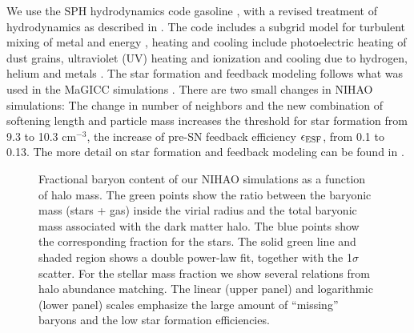 \documentclass[useAMS,usenatbib]{mn2e}
\begin{document}
We use the SPH hydrodynamics code {\sc gasoline} \citep{Wadsley04},
with a revised treatment of  hydrodynamics as described in
\citet{Keller14}.  The code includes a subgrid model for turbulent
mixing of metal and energy \citep{Wadsley08}, heating and cooling
include photoelectric heating of dust grains, ultraviolet (UV) heating
and ionization and  cooling due to hydrogen, helium and metals
\citep{Shen10}.  The star formation and feedback modeling follows what
was used in the MaGICC simulations \citep{Stinson13}.  There are two
small changes in NIHAO simulations: The change in  number of neighbors
and the new combination of softening length and  particle mass increases
the threshold for star formation from  9.3 to 10.3
cm$^{-3}$, the increase of pre-SN feedback efficiency $\epsilon_{\rm
  ESF}$, from 0.1 to 0.13.  The more detail on star formation and
feedback modeling can be found in \citet{Wang15}.





\begin{figure}
\centerline{
}
\caption{Fractional baryon content of our NIHAO simulations  as a
  function of halo mass. The green points show the ratio between the
  baryonic mass (stars + gas) inside the virial radius and the total
  baryonic mass associated with the dark matter halo. The blue points
  show the corresponding fraction for the stars. The solid green line
  and shaded region shows a double power-law fit, together with the
  1$\sigma$ scatter. For the stellar mass fraction we show several
  relations from halo abundance matching.    The linear (upper panel)
  and logarithmic (lower panel) scales emphasize the large amount of
  ``missing'' baryons and the low star formation efficiencies.}
\label{fig:budget}
\end{figure}
\end{document}
